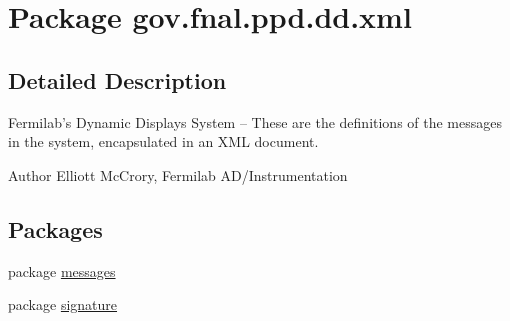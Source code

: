 \hypertarget{namespacegov_1_1fnal_1_1ppd_1_1dd_1_1xml}{\section{Package gov.\-fnal.\-ppd.\-dd.\-xml}
\label{namespacegov_1_1fnal_1_1ppd_1_1dd_1_1xml}
}


\subsection{Detailed Description}
Fermilab's Dynamic Displays System -- These are the definitions of the messages in the system, encapsulated in an X\-M\-L document. 

\begin{DoxyAuthor}{Author}
Elliott Mc\-Crory, Fermilab A\-D/\-Instrumentation 
\end{DoxyAuthor}
\subsection*{Packages}
\begin{DoxyCompactItemize}
\item 
package \hyperlink{namespacegov_1_1fnal_1_1ppd_1_1dd_1_1xml_1_1messages}{messages}
\item 
package \hyperlink{namespacegov_1_1fnal_1_1ppd_1_1dd_1_1xml_1_1signature}{signature}
\end{DoxyCompactItemize}
